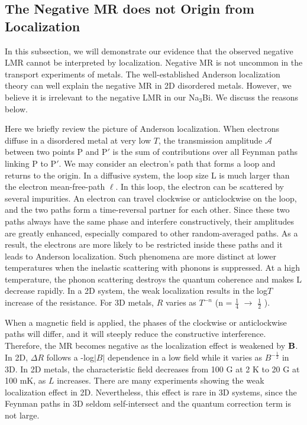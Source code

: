 \subsection{The Negative MR does not Origin from Localization}

In this subsection, we will demonstrate our evidence that the observed negative LMR cannot be interpreted by localization. Negative MR is not uncommon in the transport experiments of metals. The well-established Anderson localization theory can well explain the negative MR in 2D disordered metals. However, we believe it is irrelevant to the negative LMR in our Na$_3$Bi. We discuss the reasons below.

Here we briefly review the picture of Anderson localization. When electrons diffuse in a disordered metal at very low $T$, the transmission amplitude $\mathcal{A}$ between two points P and P$'$ is the sum of contributions over all Feynman paths linking P to P$'$. We may consider an electron's path that forms a loop and returns to the origin. In a diffusive system, the loop size L is much larger than the electron mean-free-path $\ell$. In this loop, the electron can be scattered by several impurities. An electron can travel clockwise or anticlockwise on the loop, and the two paths form a time-reversal partner for each other. Since these two paths always have the same phase and interfere constructively, their amplitudes are greatly enhanced, especially compared to other random-averaged paths. As a result, the electrons are more likely to be restricted inside these paths and it leads to Anderson localization. Such phenomena are more distinct at lower temperatures when the inelastic scattering with phonons is suppressed. At a high temperature, the phonon scattering destroys the quantum coherence and makes L decrease rapidly. In a 2D system, the weak localization results in the log$T$ increase of the resistance. For 3D metals, $R$ varies as $T^{-n}$ (n = $\frac14$ $\to$ $\frac12$ ).

When a magnetic field is applied, the phases of the clockwise or anticlockwise paths will differ, and it will steeply reduce the constructive interference. Therefore, the MR becomes negative as the localization effect is weakened by $\bf B$. In 2D, $\Delta R$ follows a -log$|B|$ dependence in a low field while it varies as $B^{-\frac12}$ in 3D. In 2D metals, the characteristic field decreases from 100 G at 2 K to 20 G at 100 mK, as $L$ increases. There are many experiments showing the weak localization effect in 2D. Nevertheless, this effect is rare in 3D systems, since the Feynman paths in 3D seldom self-intersect and the quantum correction term is not large.

